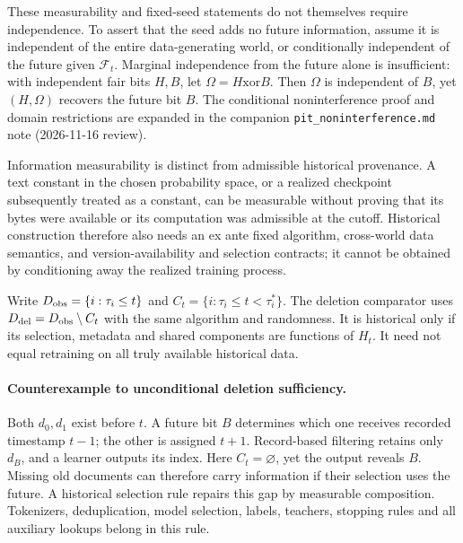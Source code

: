 \documentclass[11pt]{article}
\begin{document}
These measurability and fixed-seed statements do not themselves require
independence. To assert that the seed adds no future information, assume
it is independent of the entire data-generating world, or conditionally
independent of the future given $\mathcal F_t$. Marginal independence
from the future alone is insufficient: with independent fair bits $H,B$,
let $\Omega=H\mathbin{\mathrm{xor}}B$. Then $\Omega$ is independent of
$B$, yet $(H,\Omega)$ recovers the future bit $B$. The conditional
noninterference proof and domain restrictions are expanded in the
companion \texttt{pit\_noninterference.md} note (2026-11-16 review).

Information measurability is distinct from admissible historical provenance.
A text constant in the chosen probability space, or a realized checkpoint
subsequently treated as a constant, can be measurable without proving that
its bytes were available or its computation was admissible at the cutoff.
Historical construction therefore also needs an ex ante fixed algorithm,
cross-world data semantics, and version-availability and selection contracts;
it cannot be obtained by conditioning away the realized training process.

Write $D_{\rm obs}=\{i:\tau_i\le t\}$ and
$C_t=\{i:\tau_i\le t<\tau_i^*\}$. The deletion comparator uses
$D_{\rm del}=D_{\rm obs}\setminus C_t$ with the same algorithm and
randomness. It is historical only if its selection, metadata and shared
components are functions of $H_t$. It need not equal retraining on all
truly available historical data.

\paragraph{Counterexample to unconditional deletion sufficiency.}
Both $d_0,d_1$ exist before $t$. A future bit $B$ determines which one
receives recorded timestamp $t-1$; the other is assigned $t+1$.
Record-based filtering retains only $d_B$, and a learner outputs its
index. Here $C_t=\varnothing$, yet the output reveals $B$. Missing old
documents can therefore carry information if their selection uses the
future. A historical selection rule repairs this gap by measurable
composition. Tokenizers, deduplication, model selection, labels,
teachers, stopping rules and all auxiliary lookups belong in this rule.
\end{document}
